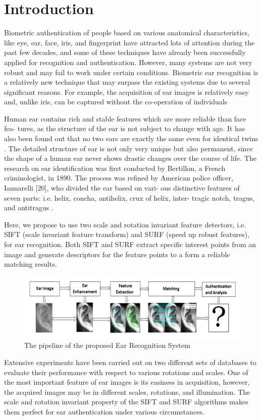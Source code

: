 \chapter{Introduction} \label{sec:intro} Biometric authentication of people based on various anatomical characteristics, like eye, ear, face, iris, and fingerprint have attracted lots of attention during the past few decades, and some of these techniques have already been successfully applied for recognition and authentication. However, many systems are not very robust and may fail to work under certain conditions. Biometric ear recognition is a relatively new technique that may surpass the existing systems due to several significant reasons. For example, the acquisition of ear images is relatively easy and, unlike iris, can be captured without the co-operation of individuals \cite{pflug2012ear}

Human ear contains rich and stable features which are more reliable than face fea- tures, as the structure of the ear is not subject to change with age. It has also been found out that no two ears are exactly the same even for identical twins \cite{abaza}. The detailed structure of ear is not only very unique but also permanent, since the shape of a human ear never shows drastic changes over the course of life. The research on ear identification was first conducted by Bertillon, a French criminologist, in 1890. The process was refined by American police officer, Iannarelli [20], who divided the ear based on vari- ous distinctive features of seven parts: i.e. helix, concha, antihelix, crux of helix, inter- tragic notch, tragus, and antitragus \cite{tariq}.

Here, we propose to use two scale and rotation invariant feature detectors, i.e. SIFT (scale invariant feature transform) and SURF (speed up robust features), for ear recognition. Both SIFT and SURF extract specific interest points from an image and generate descriptors for the feature points to a form a reliable matching results.\\
\begin{figure}[t]
	\includegraphics[width=\textwidth]{Figures/Figure1}
	\caption{The pipeline of the proposed Ear Recognition System}
	\label{fig:Figure1}
\end{figure}
Extensive experiments have been carried out on two different sets of databases to evaluate their performance with respect to various rotations and scales. One of the most important feature of ear images is its easiness in acquisition, however, the acquired images may be in different scales, rotations, and illumination. The scale and rotation invariant property of the SIFT and SURF algorithms makes them perfect for ear authentication under various circumstances.

